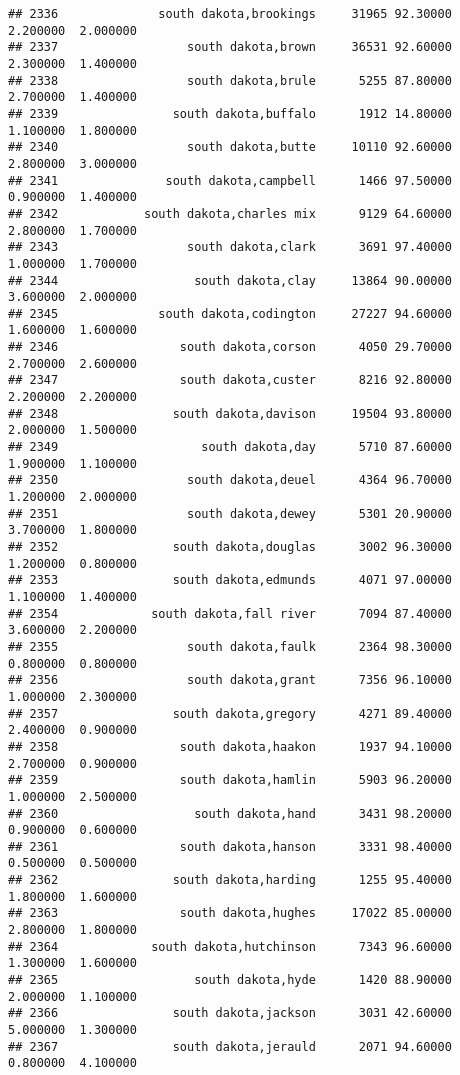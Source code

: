 \documentclass[
]{article}
\begin{document}
\begin{verbatim}
## 2336              south dakota,brookings     31965 92.30000  2.200000  2.000000
## 2337                  south dakota,brown     36531 92.60000  2.300000  1.400000
## 2338                  south dakota,brule      5255 87.80000  2.700000  1.400000
## 2339                south dakota,buffalo      1912 14.80000  1.100000  1.800000
## 2340                  south dakota,butte     10110 92.60000  2.800000  3.000000
## 2341               south dakota,campbell      1466 97.50000  0.900000  1.400000
## 2342            south dakota,charles mix      9129 64.60000  2.800000  1.700000
## 2343                  south dakota,clark      3691 97.40000  1.000000  1.700000
## 2344                   south dakota,clay     13864 90.00000  3.600000  2.000000
## 2345              south dakota,codington     27227 94.60000  1.600000  1.600000
## 2346                 south dakota,corson      4050 29.70000  2.700000  2.600000
## 2347                 south dakota,custer      8216 92.80000  2.200000  2.200000
## 2348                south dakota,davison     19504 93.80000  2.000000  1.500000
## 2349                    south dakota,day      5710 87.60000  1.900000  1.100000
## 2350                  south dakota,deuel      4364 96.70000  1.200000  2.000000
## 2351                  south dakota,dewey      5301 20.90000  3.700000  1.800000
## 2352                south dakota,douglas      3002 96.30000  1.200000  0.800000
## 2353                south dakota,edmunds      4071 97.00000  1.100000  1.400000
## 2354             south dakota,fall river      7094 87.40000  3.600000  2.200000
## 2355                  south dakota,faulk      2364 98.30000  0.800000  0.800000
## 2356                  south dakota,grant      7356 96.10000  1.000000  2.300000
## 2357                south dakota,gregory      4271 89.40000  2.400000  0.900000
## 2358                 south dakota,haakon      1937 94.10000  2.700000  0.900000
## 2359                 south dakota,hamlin      5903 96.20000  1.000000  2.500000
## 2360                   south dakota,hand      3431 98.20000  0.900000  0.600000
## 2361                 south dakota,hanson      3331 98.40000  0.500000  0.500000
## 2362                south dakota,harding      1255 95.40000  1.800000  1.600000
## 2363                 south dakota,hughes     17022 85.00000  2.800000  1.800000
## 2364             south dakota,hutchinson      7343 96.60000  1.300000  1.600000
## 2365                   south dakota,hyde      1420 88.90000  2.000000  1.100000
## 2366                south dakota,jackson      3031 42.60000  5.000000  1.300000
## 2367                south dakota,jerauld      2071 94.60000  0.800000  4.100000

\end{verbatim}
\end{document}
